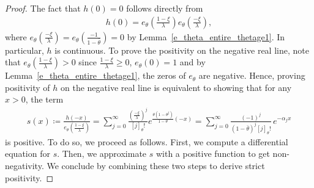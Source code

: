 \documentclass[12pt]{article}
\newcommand{\1}{\mathds{1}}
\theoremstyle{definition}
\theoremstyle{plain}
\theoremstyle{remark}
\begin{document}
\begin{proof}
The fact that $h(0)=0$ follows directly from 
\begin{align*}
    h(0)={e_\theta\left(\frac{1-\xi}{\lambda}\right)}{e_\theta\left(\frac{-\xi}{\lambda}\right)},
\end{align*}
where ${e_\theta\left(\frac{-\xi}{\lambda}\right)}={e_\theta\left(\frac{-1}{ 1-\bar \theta}\right)}=0$ by Lemma~\ref{e_theta_entire_thetage1}. In particular, $h$ is continuous. To prove the positivity on the negative real line, note that
 ${e_\theta\left(\frac{1-\xi}{\lambda}\right)}>0$
since $\frac{1-\xi}{\lambda}\ge0$, $e_\theta(0)=1$ and by Lemma~\ref{e_theta_entire_thetage1}, the zeros of $e_\theta$ are negative. Hence, proving positivity of $h$ on the negative real line is equivalent to showing that for any $x>0$, the term 
\begin{align*}
    s(x)\coloneqq \frac {h(-x)}{e_\theta\left(\frac{1-\xi}{\lambda}\right)}=\sum_{j=0}^\infty \frac{\left(\frac{-\xi}{\lambda}\right)^{j}}{[j]_\theta!}e^{\frac{\theta(1-\theta^j)}{1-\theta}(-x)}=\sum_{j=0}^\infty \frac{(-1)^j}{ (1-\bar \theta)^j [j]_\theta!}\, e^{-\alpha_j x}
\end{align*}
is positive. To do so, we proceed as follows. First, we compute a differential equation for $s$. Then, we approximate $s$ with a positive function to get non-negativity. We conclude by combining these two steps to derive strict positivity.


\end{proof}
\end{document}
